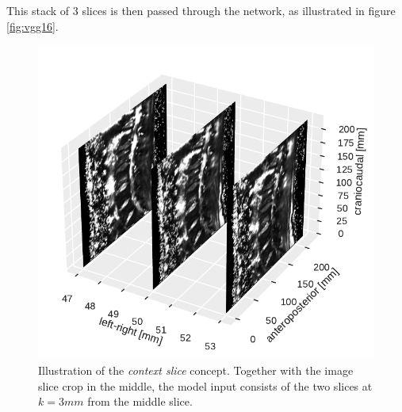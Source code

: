 This stack of 3 slices is then passed through the network, as illustrated in figure \ref{fig:vgg16}.

\begin{figure}
    \includegraphics[width=.99\textwidth]{images/Context_slices.pdf}
    \caption{Illustration of the \textit{context slice} concept. Together with the image slice crop in the middle, the model input consists of the two slices at $k=3mm$ from the middle slice.}
\end{figure}

